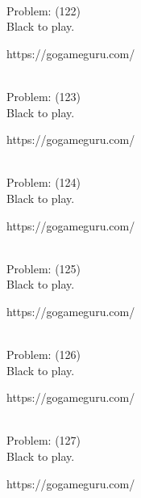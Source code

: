 \documentclass[11pt]{article}
\begin{document}
\begin{minipage}[t]{0.5\textwidth}
  {\centering
  
\\
  Problem: (122)\\
  Black to play.

https://gogameguru.com/\\
  }
\end{minipage}
\begin{minipage}[t]{0.5\textwidth}
  {\centering
  
\\
  Problem: (123)\\
  Black to play.

https://gogameguru.com/\\
  }
\end{minipage}
\begin{minipage}[t]{0.5\textwidth}
  {\centering
  
\\
  Problem: (124)\\
  Black to play.

https://gogameguru.com/\\
  }
\end{minipage}
\begin{minipage}[t]{0.5\textwidth}
  {\centering
  
\\
  Problem: (125)\\
  Black to play.

https://gogameguru.com/\\
  }
\end{minipage}
\begin{minipage}[t]{0.5\textwidth}
  {\centering
  
\\
  Problem: (126)\\
  Black to play.

https://gogameguru.com/\\
  }
\end{minipage}
\begin{minipage}[t]{0.5\textwidth}
  {\centering
  
\\
  Problem: (127)\\
  Black to play.

https://gogameguru.com/\\
  }
\end{minipage}
\end{document}
